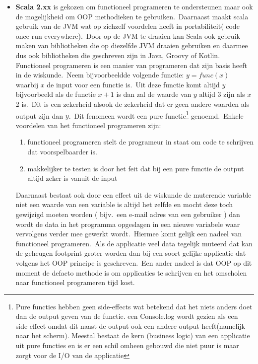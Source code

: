 \begin{itemize}
\item \textbf{Scala 2.xx} is gekozen om functioneel programeren te ondersteunen maar ook de mogelijkheid om OOP methodieken te gebruiken.\ Daarnaast maakt scala gebruik van de JVM wat op zichzelf voordelen heeft in portabiliteit( code once run everywhere).\ Door op de JVM te draaien kan Scala ook gebruik maken van bibliotheken die op diezelfde JVM draaien gebruiken en daarmee dus ook bibliotheken die geschreven zijn in Java, Groovy of Kotlin.\\
Functioneel programeren is een manier van programeren dat zijn basis heeft in de wiskunde.\ Neem bijvoorbeeldde volgende functie: \(y = func(x)\) waarbij \(x\) de input voor een functie is.\ Uit deze functie komt altijd \(y\) bijvoorbeeld als de functie \(x+1\) is dan zal de waarde van \(y\) altijd 3 zijn als \(x\) 2 is.\ Dit is een zekerheid alsook de zekerheid dat er geen andere waarden als output zijn dan \(y\).\ Dit fenomeen wordt een pure functie\footnote{Pure functies hebben geen side-effects wat betekend dat het niets anders doet dan de output geven van de functie. een Console.log wordt gezien als een side-effect omdat dit naast de output ook een andere output heeft(namelijk naar het scherm). Meestal bestaat de kern (business logic) van een applicatie uit pure functies en is er een schil omheen gebouwd die niet puur is maar zorgt voor de I/O van de applicatie} genoemd.\ Enkele voordelen van het functioneel programeren zijn:
\begin{enumerate}
  \item functioneel programeren stelt de programeur in staat om code te schrijven dat voorspelbaarder is.
  \item makkelijker te testen is door het feit dat bij een pure functie de output altijd zeker is vanuit de input
\end{enumerate}
Daarnaast bestaat ook door een effect uit de wiskunde de muterende variable niet een waarde van een variable is altijd het zelfde en mocht deze toch gewijzigd moeten worden ( bijv.\ een e-mail adres van een gebruiker ) dan wordt de data in het programma opgeslagen in een nieuwe variabele waar vervolgens verder mee gewerkt wordt.\ Hiermee komt gelijk een nadeel van functioneel programeren.\ Als de applicatie veel data tegelijk muteerd dat kan de geheugen footprint groter worden dan bij een soort gelijke applicatie dat volgens het OOP principe is geschreven.\ Een ander nadeel is dat OOP op dit moment de defacto methode is om applicaties te schrijven en het omscholen naar functioneel programeren tijd kost.


\end{itemize}
